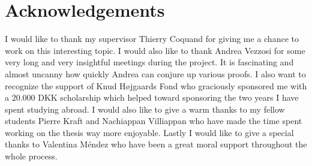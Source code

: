 \chapter*{Acknowledgements}
I would like to thank my supervisor Thierry Coquand for giving me a
chance to work on this interesting topic. I would also like to thank
Andrea Vezzosi for some very long and very insightful meetings during
the project. It is fascinating and almost uncanny how quickly Andrea
can conjure up various proofs.  I also want to recognize the support
of Knud Højgaards Fond who graciously sponsored me with a 20.000 DKK
scholarship which helped toward sponsoring the two years I have spent
studying abroad. I would also like to give a warm thanks to my fellow
students Pierre Kraft and Nachiappan Villiappan who have made the time
spent working on the thesis way more enjoyable. Lastly I would like to
give a special thanks to Valentina Méndez who have been a great moral
support throughout the whole process.
